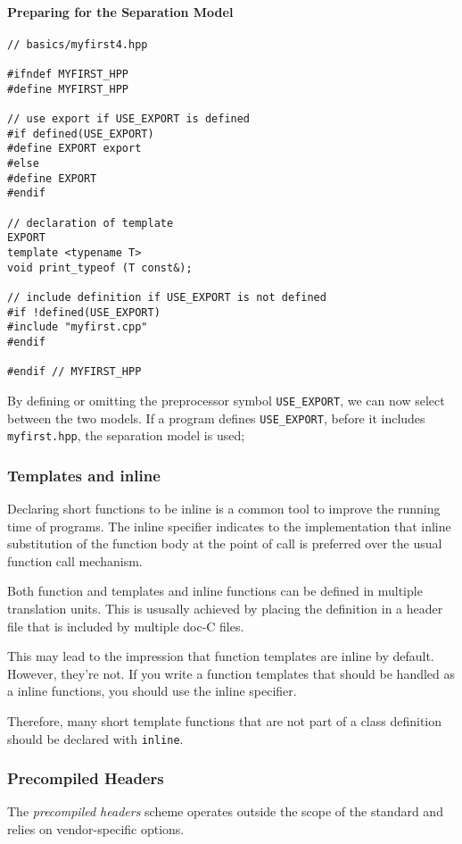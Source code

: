 \documentclass[11pt, a4paper]{book}
\begin{document}
\paragraph{Preparing for the Separation Model}
\begin{verbatim}
// basics/myfirst4.hpp 

#ifndef MYFIRST_HPP 
#define MYFIRST_HPP 

// use export if USE_EXPORT is defined 
#if defined(USE_EXPORT) 
#define EXPORT export 
#else 
#define EXPORT 
#endif 

// declaration of template 
EXPORT 
template <typename T> 
void print_typeof (T const&); 

// include definition if USE_EXPORT is not defined 
#if !defined(USE_EXPORT) 
#include "myfirst.cpp" 
#endif 

#endif // MYFIRST_HPP 
\end{verbatim}
By defining or omitting the preprocessor symbol \verb|USE_EXPORT|, we can now select between the two models. If a program defines \verb|USE_EXPORT|, before it includes \verb|myfirst.hpp|, the separation model is used;
\subsubsection{Templates and inline}
Declaring short functions to be inline is a common tool to improve the running time of programs. The inline specifier indicates to the implementation that inline substitution of the function body at the point of call is preferred over the usual function call mechanism. 

Both function and templates and inline functions can be defined in multiple translation units. This is ususally achieved by placing the definition in a header file that is included by multiple doc-C files.

This may lead to the impression that function templates are inline by default. However, they're not. If you write a function templates that should be handled as a inline functions, you should use the inline specifier. 

Therefore, many short template functions that are not part of a class definition should be declared with \verb|inline|.
\subsubsection{Precompiled Headers}
The \emph{precompiled headers} scheme operates outside the scope of the standard and relies on vendor-specific options.
\end{document}
